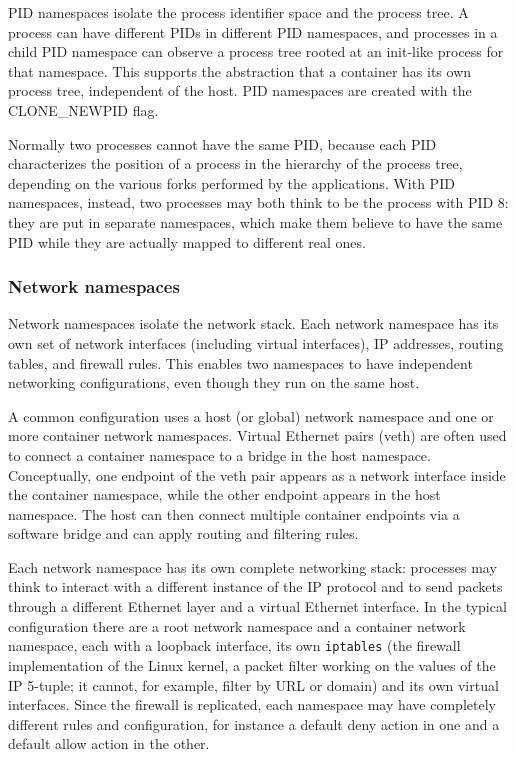 PID namespaces isolate the process identifier space and the process tree. A process can have different PIDs in different PID namespaces, and processes in a child PID namespace can observe a process tree rooted at an init-like process for that namespace. This supports the abstraction that a container has its own process tree, independent of the host. PID namespaces are created with the CLONE\_NEWPID flag.

Normally two processes cannot have the same PID, because each PID characterizes the position of a process in the hierarchy of the process tree, depending on the various forks performed by the applications. With PID namespaces, instead, two processes may both think to be the process with PID 8: they are put in separate namespaces, which make them believe to have the same PID while they are actually mapped to different real ones.

\subsubsection*{Network namespaces}

Network namespaces isolate the network stack. Each network namespace has its own set of network interfaces (including virtual interfaces), IP addresses, routing tables, and firewall rules. This enables two namespaces to have independent networking configurations, even though they run on the same host.

A common configuration uses a host (or global) network namespace and one or more container network namespaces. Virtual Ethernet pairs (veth) are often used to connect a container namespace to a bridge in the host namespace. Conceptually, one endpoint of the veth pair appears as a network interface inside the container namespace, while the other endpoint appears in the host namespace. The host can then connect multiple container endpoints via a software bridge and can apply routing and filtering rules.

Each network namespace has its own complete networking stack: processes may think to interact with a different instance of the IP protocol and to send packets through a different Ethernet layer and a virtual Ethernet interface. In the typical configuration there are a root network namespace and a container network namespace, each with a loopback interface, its own \texttt{iptables} (the firewall implementation of the Linux kernel, a packet filter working on the values of the IP 5-tuple; it cannot, for example, filter by URL or domain) and its own virtual interfaces. Since the firewall is replicated, each namespace may have completely different rules and configuration, for instance a default deny action in one and a default allow action in the other.

